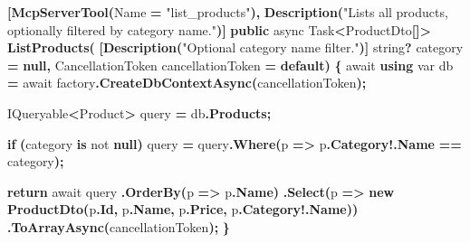 \documentclass[
  italian,
  10pt,
]{book}
\newenvironment{Shaded}{\begin{snugshade}}{\end{snugshade}}
\newcommand{\DataTypeTok}[1]{\textcolor[rgb]{0.13,0.29,0.53}{#1}}
\newcommand{\FunctionTok}[1]{\textcolor[rgb]{0.13,0.29,0.53}{\textbf{#1}}}
\newcommand{\KeywordTok}[1]{\textcolor[rgb]{0.13,0.29,0.53}{\textbf{#1}}}
\newcommand{\NormalTok}[1]{#1}
\newcommand{\OperatorTok}[1]{\textcolor[rgb]{0.81,0.36,0.00}{\textbf{#1}}}
\newcommand{\StringTok}[1]{\textcolor[rgb]{0.31,0.60,0.02}{#1}}
\begin{document}
\begin{Shaded}
\begin{Highlighting}[]
\OperatorTok{[}\FunctionTok{McpServerTool}\OperatorTok{(}\NormalTok{Name }\OperatorTok{=} \StringTok{"list\_products"}\OperatorTok{),} \FunctionTok{Description}\OperatorTok{(}\StringTok{"Lists all products, optionally filtered by category name."}\OperatorTok{)]}
\KeywordTok{public}\NormalTok{ async Task}\OperatorTok{\textless{}}\NormalTok{ProductDto}\OperatorTok{[]\textgreater{}} \FunctionTok{ListProducts}\OperatorTok{(}
    \OperatorTok{[}\FunctionTok{Description}\OperatorTok{(}\StringTok{"Optional category name filter."}\OperatorTok{)]} \DataTypeTok{string}\OperatorTok{?}\NormalTok{ category }\OperatorTok{=} \KeywordTok{null}\OperatorTok{,}
\NormalTok{    CancellationToken cancellationToken }\OperatorTok{=} \KeywordTok{default}\OperatorTok{)}
\OperatorTok{\{}
\NormalTok{    await }\KeywordTok{using} \DataTypeTok{var}\NormalTok{ db }\OperatorTok{=}\NormalTok{ await factory}\OperatorTok{.}\FunctionTok{CreateDbContextAsync}\OperatorTok{(}\NormalTok{cancellationToken}\OperatorTok{);}

\NormalTok{    IQueryable}\OperatorTok{\textless{}}\NormalTok{Product}\OperatorTok{\textgreater{}}\NormalTok{ query }\OperatorTok{=}\NormalTok{ db}\OperatorTok{.}\FunctionTok{Products}\OperatorTok{;}

    \KeywordTok{if} \OperatorTok{(}\NormalTok{category }\KeywordTok{is}\NormalTok{ not }\KeywordTok{null}\OperatorTok{)}
\NormalTok{        query }\OperatorTok{=}\NormalTok{ query}\OperatorTok{.}\FunctionTok{Where}\OperatorTok{(}\NormalTok{p }\OperatorTok{=\textgreater{}}\NormalTok{ p}\OperatorTok{.}\FunctionTok{Category}\OperatorTok{!.}\FunctionTok{Name} \OperatorTok{==}\NormalTok{ category}\OperatorTok{);}

    \KeywordTok{return}\NormalTok{ await query}
        \OperatorTok{.}\FunctionTok{OrderBy}\OperatorTok{(}\NormalTok{p }\OperatorTok{=\textgreater{}}\NormalTok{ p}\OperatorTok{.}\FunctionTok{Name}\OperatorTok{)}
        \OperatorTok{.}\FunctionTok{Select}\OperatorTok{(}\NormalTok{p }\OperatorTok{=\textgreater{}} \KeywordTok{new} \FunctionTok{ProductDto}\OperatorTok{(}\NormalTok{p}\OperatorTok{.}\FunctionTok{Id}\OperatorTok{,}\NormalTok{ p}\OperatorTok{.}\FunctionTok{Name}\OperatorTok{,}\NormalTok{ p}\OperatorTok{.}\FunctionTok{Price}\OperatorTok{,}\NormalTok{ p}\OperatorTok{.}\FunctionTok{Category}\OperatorTok{!.}\FunctionTok{Name}\OperatorTok{))}
        \OperatorTok{.}\FunctionTok{ToArrayAsync}\OperatorTok{(}\NormalTok{cancellationToken}\OperatorTok{);}
\OperatorTok{\}}
\end{Highlighting}
\end{Shaded}
\end{document}
